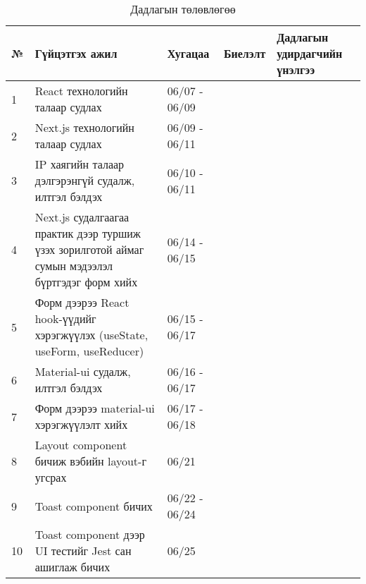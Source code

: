 \begin{table}[h]
\caption{Дадлагын төлөвлөгөө}
\begin{tabular}{|p{0.5cm}|p{8cm}|l|l|p{3cm}|}
\hline
\textbf{№} & \textbf{Гүйцэтгэх ажил} & \textbf{Хугацаа} & \textbf{Биелэлт} & \textbf{Дадлагын удирдагчийн үнэлгээ} \\ \hline
1          &    React технологийн талаар судлах                 &        06/07 - 06/09         &                  &                                       \\ \hline
2          &  Next.js технологийн талаар судлах                       &      06/09 - 06/11           &                  &                                       \\ \hline
3       & IP хаягийн талаар дэлгэрэнгүй судалж, илтгэл бэлдэх &  06/10 - 06/11 &  & \\ \hline
4          &          Next.js судалгаагаа практик дээр туршиж үзэх зорилготой аймаг сумын мэдээлэл бүртгэдэг форм хийх             &      06/14 - 06/15          &                  &                                       \\ \hline
5          &         Форм дээрээ React hook-үүдийг хэрэгжүүлэх (useState, useForm, useReducer)              &          06/15 - 06/17       &                  &                                       \\ \hline
6          &         Material-ui судалж, илтгэл бэлдэх            &          06/16 - 06/17        &                  &                                       \\ \hline
7  &   Форм дээрээ material-ui хэрэгжүүлэлт хийх    &       06/17 - 06/18                  &                  &                                                      \\ \hline
8          &     Layout component бичиж вэбийн layout-г угсрах             &     06/21             &                  &                                      \\ \hline
9         &     Toast component бичих             &     06/22 - 06/24           &                  &                                      \\ \hline
10          &     Toast component дээр UI тестийг Jest сан ашиглаж бичих             &     06/25             &                  &                                      \\ \hline
\end{tabular}
\end{table}

